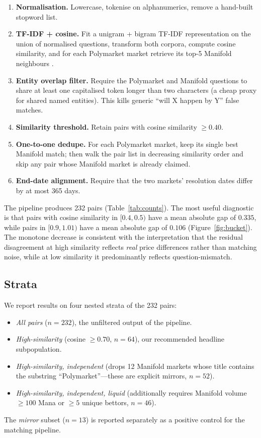 \documentclass{article}
\begin{document}
\begin{enumerate}
  \item \textbf{Normalisation.} Lowercase, tokenise on alphanumerics, remove a hand-built stopword list.
  \item \textbf{TF-IDF + cosine.} Fit a unigram + bigram TF-IDF representation on the union of normalised questions, transform both corpora, compute cosine similarity, and for each Polymarket market retrieve its top-5 Manifold neighbours \citep{scikitlearn}.
  \item \textbf{Entity overlap filter.} Require the Polymarket and Manifold questions to share at least one capitalised token longer than two characters (a cheap proxy for shared named entities). This kills generic ``will X happen by Y'' false matches.
  \item \textbf{Similarity threshold.} Retain pairs with cosine similarity $\geq 0.40$.
  \item \textbf{One-to-one dedupe.} For each Polymarket market, keep its single best Manifold match; then walk the pair list in decreasing similarity order and skip any pair whose Manifold market is already claimed.
  \item \textbf{End-date alignment.} Require that the two markets' resolution dates differ by at most 365 days.
\end{enumerate}

The pipeline produces 232 pairs (Table~\ref{tab:counts}). The most useful diagnostic is that pairs with cosine similarity in $[0.4, 0.5)$ have a mean absolute gap of $0.335$, while pairs in $[0.9, 1.01)$ have a mean absolute gap of $0.106$ (Figure~\ref{fig:bucket}). The monotone decrease is consistent with the interpretation that the residual disagreement at high similarity reflects \emph{real} price differences rather than matching noise, while at low similarity it predominantly reflects question-mismatch.

\subsection{Strata}

We report results on four nested strata of the 232 pairs:
\begin{itemize}
  \item \emph{All pairs} ($n=232$), the unfiltered output of the pipeline.
  \item \emph{High-similarity} (cosine $\geq 0.70$, $n=64$), our recommended headline subpopulation.
  \item \emph{High-similarity, independent} (drops 12 Manifold markets whose title contains the substring ``Polymarket''---these are explicit mirrors, $n=52$).
  \item \emph{High-similarity, independent, liquid} (additionally requires Manifold volume $\geq 100$ Mana or $\geq 5$ unique bettors, $n=46$).
\end{itemize}
The \emph{mirror} subset ($n=13$) is reported separately as a positive control for the matching pipeline.
\end{document}
